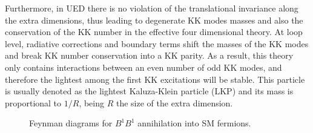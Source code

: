 Furthermore, in UED there is no violation of the translational invariance along the extra dimensions, thus leading to degenerate KK modes masses  and also the conservation of the KK number in the effective four dimensional theory. At loop level, radiative corrections and boundary terms shift the masses of the KK modes and break KK number conservation into a KK parity. As a result, this theory only contains interactions between an even number of odd KK modes, and therefore the lightest among the first KK excitations will be stable. This particle is usually denoted as the lightest Kaluza-Klein particle (LKP) and its mass is proportional to $1/R$, being $R$ the size of the extra dimension.

\begin{figure}
	\centering
	\begin{subfigure}{0.4\textwidth}
		\centering
	\end{subfigure}
	\begin{subfigure}{0.4\textwidth}
		\centering
	\end{subfigure}
	\caption{Feynman diagrams for $B^{1}$$B^{1}$ annihilation into SM fermions.}
	\label{fig:lkp_diagrams_fermion}
\end{figure}

